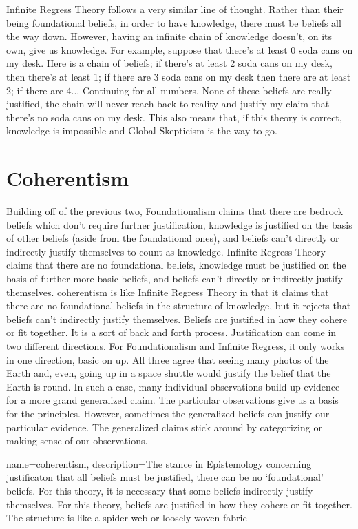 Infinite Regress Theory follows a very similar line of thought. Rather than their being foundational beliefs, in order to have knowledge, there must be beliefs all the way down.  However, having an infinite chain of knowledge doesn't, on its own, give us knowledge. For example, suppose that there's at least 0 soda cans on my desk. Here is a chain of beliefs; if there's at least 2 soda cans on my desk, then there's at least 1; if there are 3 soda cans on my desk then there are at least 2; if there are 4... Continuing for all numbers. None of these beliefs are really justified,  the chain will never reach back to reality and justify my claim that there's no soda cans on my desk. This also means that, if this theory is correct, knowledge is impossible and Global Skepticism is the way to go. 

\section{Coherentism}

Building off of the previous two, Foundationalism claims that there are bedrock beliefs which don't require further justification, knowledge is justified on the basis of other beliefs (aside from the foundational ones), and beliefs can't directly or indirectly justify themselves to count as knowledge. Infinite Regress Theory claims that there are no foundational beliefs, knowledge must be justified on the basis of further more basic beliefs, and beliefs can't directly or indirectly justify themselves.  \Gls{coherentism} is like Infinite Regress Theory in that it claims that there are no foundational beliefs in the structure of knowledge, but it rejects that beliefs can't indirectly justify themselves. Beliefs are justified in how they cohere or fit together. It is a sort of back and forth process. Justification can come in two different directions. For Foundationalism and Infinite Regress, it only works in one direction, basic on up. All three agree that seeing many photos of the Earth and, even, going up in a space shuttle would justify the belief that the Earth is round. In such a case, many individual observations build up evidence for a more grand generalized claim. The particular observations give us a basis for the principles. However, sometimes the generalized beliefs can justify our particular evidence. The generalized claims stick around by categorizing or making sense of our observations.

{
name=coherentism,
description={The stance in Epistemology concerning justificaton that all beliefs must be justified, there can be no `foundational' beliefs. For this theory, it is necessary that some beliefs indirectly justify themselves. For this theory, beliefs are justified in how they cohere or fit together. The structure is like a spider web or loosely woven fabric}
}


